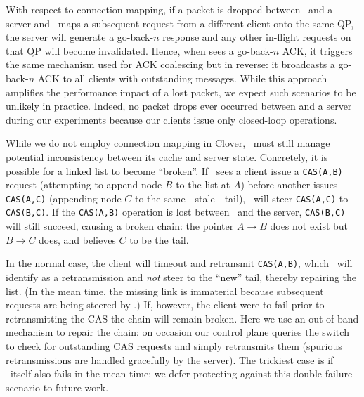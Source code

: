 With respect to connection mapping, 
if a packet is dropped between \sword\ and a server and \sword\ maps a
subsequent request from a different client onto the same QP, the
server will generate a go-back-$n$ response and any other in-flight
requests on that QP will become invalidated.  Hence, when {\sword}
sees a go-back-$n$ ACK, it triggers the same mechanism used for ACK
coalescing but in reverse: it broadcasts a go-back-$n$ ACK to all
clients with outstanding messages.  While this approach amplifies the
performance impact of a lost packet, we expect such scenarios to be
unlikely in practice.  Indeed, no packet drops ever occurred between
{\sword} and a server during our experiments because our clients issue
only closed-loop operations.

While we do not employ connection mapping in Clover,
\sword\ must still manage
potential inconsistency between its cache and server state.
Concretely, it is possible for a linked list to
become ``broken''.  If \sword\ sees a client issue a \texttt{CAS(A,B)}
request (attempting to append node $B$ to the list at $A$) before
another issues \texttt{CAS(A,C)} (appending node $C$ to the
same---stale---tail), \sword\ will steer \texttt{CAS(A,C)} to
\texttt{CAS(B,C)}. If the \texttt{CAS(A,B)} operation is lost between
\sword\ and the server, \texttt{CAS(B,C)} will still succeed, causing
a broken chain: the pointer $A\rightarrow B$ does not exist but
$B\rightarrow C$ does, and {\sword} believes $C$ to be the tail.

In the normal case, the client will timeout and retransmit
\texttt{CAS(A,B)}, which \sword\ will identify as a retransmission and
\emph{not} steer to the ``new'' tail, thereby repairing the list.  (In
the mean time, the missing link is immaterial because
subsequent requests are being steered by \sword.)  If, however, the client
were to fail prior to retransmitting the CAS the chain will remain broken.
Here we use an out-of-band mechanism to repair the chain: on occasion
our control plane queries the switch to check for outstanding CAS
requests and simply retransmits them (spurious retransmissions are
handled gracefully by the server).  The trickiest case is if
\sword\ itself also fails in the mean time: we defer protecting
against this double-failure scenario to future work.





